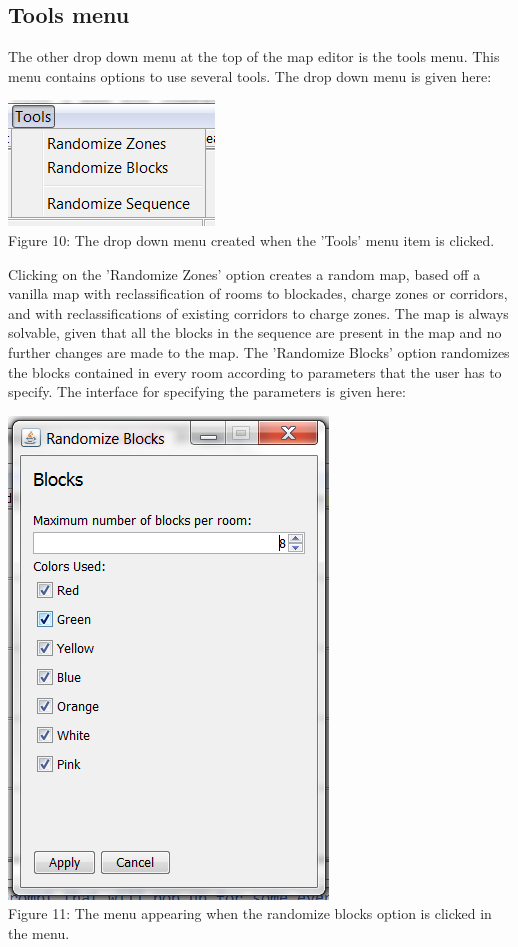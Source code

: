 \subsection{Tools menu}
The other drop down menu at the top of the map editor is the tools menu. This menu contains options to use several tools. The drop down menu is given here:
\begin{center}
	\centering
	\includegraphics{DropDownTools.png}\\
	Figure 10: The drop down menu created when the 'Tools' menu item is clicked.
\end{center}
Clicking on the 'Randomize Zones' option creates a random map, based off a vanilla map with reclassification of rooms to blockades, charge zones or corridors, and with reclassifications of existing corridors to charge zones. The map is always solvable, given that all the blocks in the sequence are present in the map and no further changes are made to the map. The 'Randomize Blocks' option randomizes the blocks contained in every room according to parameters that the user has to specify. The interface for specifying the parameters is given here:
\begin{center}
	\centering
	\includegraphics[scale=0.6]{MenuBlocks.png}\\
	Figure 11: The menu appearing when the randomize blocks option is clicked in the menu.
\end{center}
